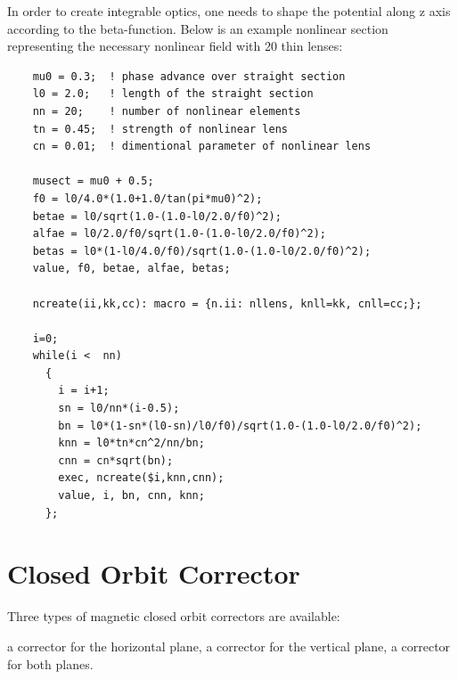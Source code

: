 In order to create integrable optics, one needs to shape the potential
along z axis according to the beta-function. Below is an example
nonlinear section representing the necessary nonlinear field with 20
thin lenses:  
\begin{verbatim}
    mu0 = 0.3;  ! phase advance over straight section
    l0 = 2.0;   ! length of the straight section
    nn = 20;    ! number of nonlinear elements
    tn = 0.45;  ! strength of nonlinear lens
    cn = 0.01;  ! dimentional parameter of nonlinear lens

    musect = mu0 + 0.5;
    f0 = l0/4.0*(1.0+1.0/tan(pi*mu0)^2);
    betae = l0/sqrt(1.0-(1.0-l0/2.0/f0)^2);
    alfae = l0/2.0/f0/sqrt(1.0-(1.0-l0/2.0/f0)^2);
    betas = l0*(1-l0/4.0/f0)/sqrt(1.0-(1.0-l0/2.0/f0)^2);
    value, f0, betae, alfae, betas;

    ncreate(ii,kk,cc): macro = {n.ii: nllens, knll=kk, cnll=cc;};

    i=0;
    while(i <  nn)
      {
        i = i+1;
        sn = l0/nn*(i-0.5);
        bn = l0*(1-sn*(l0-sn)/l0/f0)/sqrt(1.0-(1.0-l0/2.0/f0)^2);
        knn = l0*tn*cn^2/nn/bn;
        cnn = cn*sqrt(bn);
        exec, ncreate($i,knn,cnn);
        value, i, bn, cnn, knn;
      };
\end{verbatim}


  



\section{Closed Orbit Corrector}
\label{sec:closed_orbit_cor}\label{sec:kicker}

Three types of magnetic closed orbit correctors are available: 
\begin{madlist}
    a corrector for the horizontal plane, 
    a corrector for the vertical plane, 
    a corrector for both planes. 
\end{madlist}

